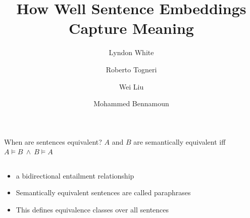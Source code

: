 \documentclass[12pt,landscape,english]{beamer}
\begin{document}

\title[White et al.]{How Well Sentence Embeddings Capture Meaning}
\author[White et al.]{Lyndon White \and Roberto Togneri \and Wei Liu \and Mohammed Bennamoun}
\date{}

\begin{frame}[plain]
	\titlepage
\end{frame}



\begin{frame}{When are sentences equivalent?}
	$A$ and $B$ are semantically equivalent iff $A\models B\:\wedge\:B\models A$
	\begin{columns}
		\begin{column}{0.5\textwidth}
			\begin{itemize}
				
				\item<1-> a bidirectional entailment relationship
				\item<2> Semantically equivalent sentences are called \alert{paraphrases}
				\item<3> This defines equivalence classes over all sentences
			\end{itemize}
		\end{column}
		\begin{column}{0.5\textwidth}
		\
		\end{column}
	\end{columns}
\end{frame}
\end{document}
